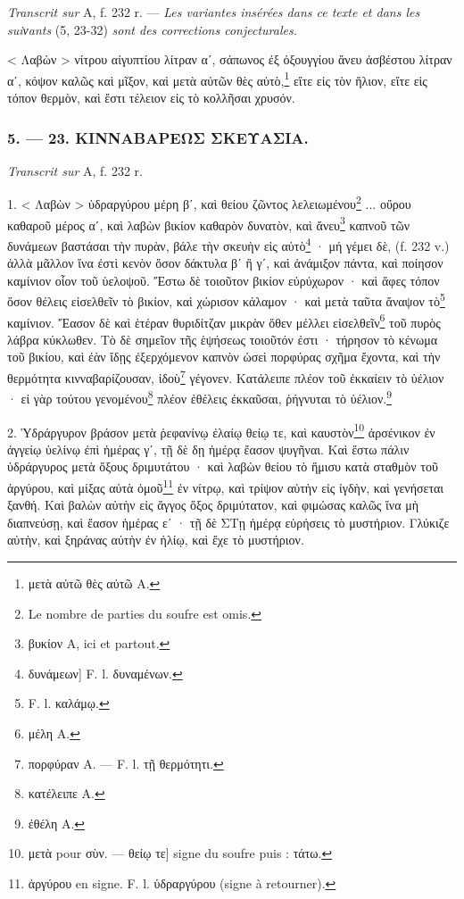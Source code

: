 \documentclass[a4paper, 11pt, oneside, polutonikogreek, french]{article}
\begin{document}
\emph{Transcrit sur} A, f. 232 r. --- \emph{Les variantes insérées dans ce texte et dans les suiνants} (5, 23-32) \emph{sont des corrections conjecturales.}

\bigskip

< Λαβὼν > νίτρου αἰγυπτίου λίτραν αʹ, σάπωνος ἐξ ὀξουγγίου ἄνευ ἀσβέστου λίτραν αʹ, κόψον καλῶς καὶ μῖξον, καὶ μετὰ αὐτῶν θὲς αὐτὸ,\footnote{μετὰ αὐτῶ θὲς αὐτῶ A.} εἴτε εἰς τὸν ἥλιον, εἴτε εἰς τόπον θερμὸν, καὶ ἔστι τέλειον εἰς τὸ κολλῆσαι χρυσόν.

\bigskip
\centerline{\EightStarTaper}
\centerline{\EightStarTaper\EightStarTaper}
\bigskip

\subsubsection{5. --- 23. ΚΙΝΝΑΒΑΡΕΩΣ ΣΚΕΥΑΣΙΑ.}

\emph{Transcrit sur} A, f. 232 r.

\bigskip

1. < Λαβὼν > ὑδραργύρου μέρη βʹ, καὶ θείου ζῶντος λελειωμένου\footnote{Le nombre de parties du soufre est omis.} ... οὔρου καθαροῦ μέρος αʹ, καὶ λαβὼν βικίον καθαρὸν δυνατὸν, καὶ ἄνευ\footnote{βυκίον A, ici et partout.} καπνοῦ τῶν δυνάμεων βαστάσαι τὴν πυρὰν, βάλε τὴν σκευὴν εἰς αὐτὸ\footnote{δυνάμεων] F. l. δυναμένων.} · μή γέμει δὲ, (f. 232 v.) ἀλλὰ μᾶλλον ἵνα ἐστὶ κενὸν ὅσον δάκτυλα βʹ ἢ γʹ, καὶ ἀνάμιξον πάντα, καὶ ποίησον καμίνιον οἷον τοῦ ὑελοψοῦ. Ἔστω δὲ τοιοῦτον βικίον εὐρύχωρον · καὶ ἄφες τόπον ὅσον θέλεις εἰσελθεῖν τὸ βικίον, καὶ χώρισον κάλαμον · καὶ μετὰ ταῦτα ἄναψον τὸ\footnote{F. l. καλάμῳ.} καμίνιον. Ἔασον δὲ καὶ ἑτέραν θυριδίτζαν μικρὰν ὅθεν μέλλει εἰσελθεῖν\footnote{μέλη A.} τοῦ πυρὸς λάβρα κύκλωθεν. Τὸ δὲ σημεῖον τῆς ἑψήσεως τοιοῦτόν ἐστι · τήρησον τὸ κένωμα τοῦ βικίου, καὶ ἐὰν ἴδῃς ἐξερχόμενον καπνὸν ὡσεὶ πορφύρας σχῆμα ἔχοντα, καὶ τὴν θερμότητα κινναβαρίζουσαν, ἰδοὺ\footnote{πορφύραν A. --- F. l. τῇ θερμότητι.} γέγονεν. Κατάλειπε πλέον τοῦ ἐκκαίειν τὸ ὑέλιον · εἰ γὰρ τούτου γενομένου\footnote{κατέλειπε A.} πλέον ἐθέλεις ἐκκαῦσαι, ῥήγνυται τὸ ὑέλιον.\footnote{ἐθέλη A.}

2. Ὑδράργυρον βράσον μετὰ ῥεφανίνῳ ἐλαίῳ θείῳ τε, καὶ καυστὸν\footnote{μετὰ pour σὺν. --- θείῳ τε] signe du soufre puis : τάτω.} ἀρσένικον ἐν ἀγγείῳ ὑελίνῳ ἐπὶ ἡμέρας γʹ, τῇ δὲ δῃ ἡμέρᾳ ἔασον ψυγῆναι. Καὶ ἔστω πάλιν ὑδράργυρος μετὰ ὄξους δριμυτάτου · καὶ λαβὼν θείου τὸ ἥμισυ κατὰ σταθμὸν τοῦ ἀργύρου, καὶ μίξας αὐτὰ ὁμοῦ\footnote{ἀργύρου en signe. F. l. ὑδραργύρου (signe à retourner).} ἐν νίτρῳ, καὶ τρίψον αὐτὴν εἰς ἰγδὴν, καὶ γενήσεται ξανθή. Καὶ βαλὼν αὐτὴν εἰς ἄγγος ὄξος δριμύτατον, καὶ φιμώσας καλῶς ἵνα μὴ διαπνεύσῃ, καὶ ἔασον ἡμέρας εʹ · τῇ δὲ ΣΤῃ ἡμέρᾳ εὑρήσεις τὸ μυστήριον. Γλύκιζε αὐτὴν, καὶ ξηράνας αὐτὴν ἐν ἡλίῳ, καὶ ἔχε τὸ μυστήριον.
\end{document}
